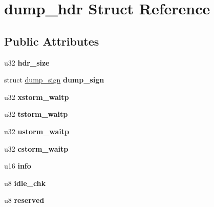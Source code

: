 \hypertarget{structdump__hdr}{
\section{dump\_\-hdr Struct Reference}
\label{structdump__hdr}
}
\subsection*{Public Attributes}
\begin{DoxyCompactItemize}
\item 
\hypertarget{structdump__hdr_aac9b4a17957e2d7e352d7a0b7c49b951}{
u32 {\bfseries hdr\_\-size}}
\label{structdump__hdr_aac9b4a17957e2d7e352d7a0b7c49b951}

\item 
\hypertarget{structdump__hdr_a92c5ea772991701f26b7939ba1aabf0e}{
struct \hyperlink{structdump__sign}{dump\_\-sign} {\bfseries dump\_\-sign}}
\label{structdump__hdr_a92c5ea772991701f26b7939ba1aabf0e}

\item 
\hypertarget{structdump__hdr_a9bd0112f1521c2cd97b915892eba60be}{
u32 {\bfseries xstorm\_\-waitp}}
\label{structdump__hdr_a9bd0112f1521c2cd97b915892eba60be}

\item 
\hypertarget{structdump__hdr_a22f51cdca91769f9096d0560861162e5}{
u32 {\bfseries tstorm\_\-waitp}}
\label{structdump__hdr_a22f51cdca91769f9096d0560861162e5}

\item 
\hypertarget{structdump__hdr_ad2493bb726d5cbf00246cabb58db6019}{
u32 {\bfseries ustorm\_\-waitp}}
\label{structdump__hdr_ad2493bb726d5cbf00246cabb58db6019}

\item 
\hypertarget{structdump__hdr_a4563816f67e8c0d86c3853cf7e4b1556}{
u32 {\bfseries cstorm\_\-waitp}}
\label{structdump__hdr_a4563816f67e8c0d86c3853cf7e4b1556}

\item 
\hypertarget{structdump__hdr_ab086c3b4379ec43108a96eee2fdc32a1}{
u16 {\bfseries info}}
\label{structdump__hdr_ab086c3b4379ec43108a96eee2fdc32a1}

\item 
\hypertarget{structdump__hdr_a7660db098db33f907c8cda9e233bda29}{
u8 {\bfseries idle\_\-chk}}
\label{structdump__hdr_a7660db098db33f907c8cda9e233bda29}

\item 
\hypertarget{structdump__hdr_a5ad2749daac12c64fdf346980b7e628d}{
u8 {\bfseries reserved}}
\label{structdump__hdr_a5ad2749daac12c64fdf346980b7e628d}

\end{DoxyCompactItemize}


